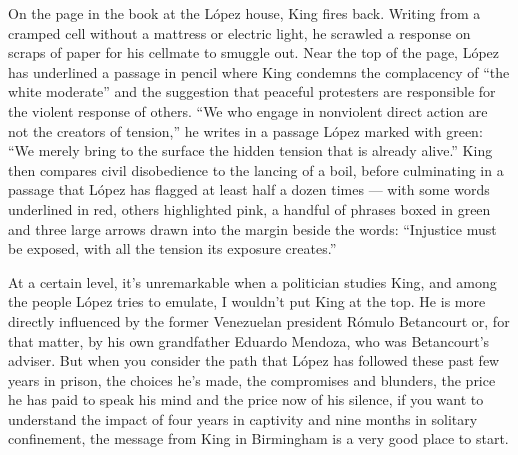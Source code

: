 On the page in the book at the López house, King fires back. Writing
from a cramped cell without a mattress or electric light, he scrawled a
response on scraps of paper for his cellmate to smuggle out. Near the
top of the page, López has underlined a passage in pencil where King
condemns the complacency of ``the white moderate'' and the suggestion
that peaceful protesters are responsible for the violent response of
others. ``We who engage in nonviolent direct action are not the creators
of tension,'' he writes in a passage López marked with green: ``We
merely bring to the surface the hidden tension that is already alive.''
King then compares civil disobedience to the lancing of a boil, before
culminating in a passage that López has flagged at least half a dozen
times --- with some words underlined in red, others highlighted pink, a
handful of phrases boxed in green and three large arrows drawn into the
margin beside the words: ``Injustice must be exposed, with all the
tension its exposure creates.''

At a certain level, it's unremarkable when a politician studies King,
and among the people López tries to emulate, I wouldn't put King at the
top. He is more directly influenced by the former Venezuelan president
Rómulo Betancourt or, for that matter, by his own grandfather Eduardo
Mendoza, who was Betancourt's adviser. But when you consider the path
that López has followed these past few years in prison, the choices he's
made, the compromises and blunders, the price he has paid to speak his
mind and the price now of his silence, if you want to understand the
impact of four years in captivity and nine months in solitary
confinement, the message from King in Birmingham is a very good place to
start.

